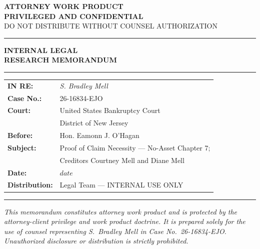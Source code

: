 \documentclass[12pt,letterpaper]{article}
\begin{document}
\begin{titlepage}
\thispagestyle{empty}
\begin{center}

\vspace*{0.6in}

{\Large\bfseries\textcolor{confRed}{ATTORNEY WORK PRODUCT}}\\[0.2em]
{\Large\bfseries\textcolor{confRed}{PRIVILEGED AND CONFIDENTIAL}}\\[0.2em]
{\normalsize\textcolor{confRed}{DO NOT DISTRIBUTE WITHOUT COUNSEL AUTHORIZATION}}

\vspace{0.4in}
{\color{ruleColor}\rule{5in}{1.5pt}}
\vspace{0.4in}

{\Huge\bfseries INTERNAL LEGAL}\\[0.15em]
{\Huge\bfseries RESEARCH MEMORANDUM}

\vspace{0.4in}
{\color{ruleColor}\rule{5in}{0.4pt}}
\vspace{0.4in}

\begin{tabular}{@{}ll@{}}
\textbf{IN RE:} & \textit{S. Bradley Mell} \\[0.4em]
\textbf{Case No.:} & 26-16834-EJO \\[0.4em]
\textbf{Court:} & United States Bankruptcy Court \\
               & District of New Jersey \\[0.4em]
\textbf{Before:} & Hon. Eamonn J. O'Hagan \\[0.8em]
\textbf{Subject:} & Proof of Claim Necessity --- No-Asset Chapter 7; \\
                  & Creditors Courtney Mell and Diane Mell \\[0.8em]
\textbf{Date:} & $date$ \\[0.4em]
\textbf{Distribution:} & Legal Team --- INTERNAL USE ONLY \\
\end{tabular}

\vspace{0.4in}
{\color{ruleColor}\rule{5in}{0.4pt}}
\vspace{0.3in}

\begin{minipage}{4.5in}
\small\itshape
This memorandum constitutes attorney work product and is protected by
the attorney-client privilege and work product doctrine. It is prepared
solely for the use of counsel representing S.~Bradley Mell in
Case No.~26-16834-EJO. Unauthorized disclosure or distribution is
strictly prohibited.
\end{minipage}

\end{center}
\end{titlepage}
\end{document}
